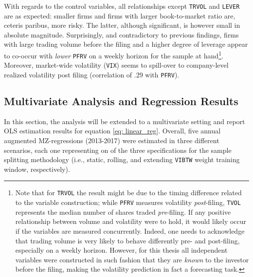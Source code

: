 With regards to the control variables, all relationships except \texttt{TRVOL} and \texttt{LEVER} are as expected: smaller firms and firms with larger book-to-market ratio are, ceteris paribus, more risky. The latter, although significant, is however small in absolute magnitude. Surprisingly, and contradictory to previous findings, firms with large trading volume before the filing and a higher degree of leverage appear to co-occur with \textit{lower} \texttt{PFRV} on a weekly horizon for the sample at hand\footnote{Note that for \texttt{TRVOL} the result might be due to the timing difference related to the variable construction; while \texttt{PFRV} measures volatility \textit{post}-filing, \texttt{TVOL} represents the median number of shares traded \textit{pre}-filing. If any positive relationship between volume and volatility were to hold, it would likely occur if the variables are measured concurrently. Indeed, one needs to acknowledge that trading volume is very likely to behave differently pre- and post-filing, especially on a weekly horizon. However, for this thesis all independent variables were constructed in such fashion that they are \textit{known} to the investor before the filing, making the volatility prediction in fact a forecasting task.}. Moreover, market-wide volatility (\texttt{VIX}) seems to spill-over to company-level realized volatility post filing (correlation of .29 with \texttt{PFRV}).


\subsection{Multivariate Analysis and Regression Results}
\label{ssec: results_multivariate}
In this section, the analysis will be extended to a multivariate setting and report OLS estimation results for equation \eqref{eq: linear_reg}. Overall, five annual augmented MZ-regressions (2013-2017) were estimated in three different scenarios, each one representing on of the three specifications for the sample splitting methodology (i.e., static, rolling, and extending \texttt{VIBTW} weight training window, respectively). 

